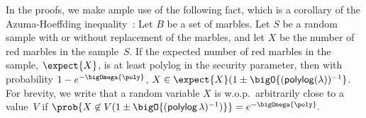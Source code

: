\documentclass[runningheads,a4paper]{llncs}
\begin{document}

In the proofs, we make ample use of the following fact, which is a corollary of the Azuma-Hoeffding inequality~\cite[Theorem 13.7]{MU05}:
Let $B$ be a set of marbles. 
Let $S$ be a random sample with or without replacement of the marbles, and  
let $X$ be the number of red marbles in the sample~$S$. 
If the expected number of red marbles in the sample, $\expect{X}$, is at least polylog in the security parameter, then with probability
$1-e^{-\bigOmega{\poly}}$, 
$X\in \expect{X} (1\pm \bigO{(\polylog (\lambda))^{-1}}$. 
For brevity, we write that a random variable $X$ is w.o.p.\ arbitrarily close to a value~$V$ if 
$\prob{X\not\in V(1\pm \bigO{(\polylog \thinspace \secpar)^{-1})}} = e^{-\bigOmega{\poly}}.$

\iffalse
\begin{proof} 
For any constant $\alpha > 0$, the probability that $X$ deviates from $\expect{X}$ by more than $\alpha \expect{X}$ is given by 
$\prob{|X - \expect{X}| \ge \alpha \expect{X}} \le 1/(2 e^{\alpha^2\expect{X}/3})$. 
Since $\expect{X}$ polylog in the security parameter, it follows that  
$\prob{|X - \expect{X}| \ge \alpha \expect{X}}$ 
is negligibly small. 
\end{proof}
\fi
\end{document}

